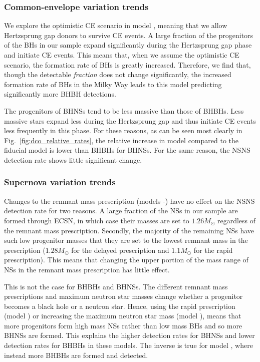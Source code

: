 \subsubsection{Common-envelope variation trends}\label{sec:detection_rate_CE_trends}


We explore the optimistic CE scenario in model \modOpt{}, meaning that we allow Hertzsprung gap donors to survive CE events. A large fraction of the progenitors of the BHs in our sample expand significantly during the Hertzsprung gap phase and initiate CE events. This means that, when we assume the optimistic CE scenario, the formation rate of BHs is greatly increased. Therefore, we find that, though the detectable \textit{fraction} does not change significantly, the increased formation rate of BHs in the Milky Way leads to this model predicting significantly more BHBH detections.

The progenitors of BHNSs tend to be less massive than those of BHBHs. Less massive stars expand less during the Hertzsprung gap and thus initiate CE events less frequently in this phase. For these reasons, as can be seen most clearly in Fig.~\ref{fig:dco_relative_rates}, the relative increase in model \modOpt{} compared to the fiducial model is lower than BHBHs for BHNSs. For the same reason, the NSNS detection rate shows little significant change.

\subsubsection{Supernova variation trends}

Changes to the remnant mass prescription (models \modRapid{}-\modNSHigh{}) have no effect on the NSNS detection rate for two reasons. A large fraction of the NSs in our sample are formed through ECSN, in which case their masses are set to $1.26 \unit{M_\odot}$ regardless of the remnant mass prescription. Secondly, the majority of the remaining NSs have such low progenitor masses that they are set to the lowest remnant mass in the prescription ($1.28 \unit{M_\odot}$ for the delayed prescription and $1.1 \unit{M_\odot}$ for the rapid prescription). This means that changing the upper portion of the mass range of NSs in the remnant mass prescription has little effect.

This is not the case for BHBHs and BHNSs. The different remnant mass prescriptions and maximum neutron star masses change whether a progenitor becomes a black hole or a neutron star. Hence, using the rapid prescription (model \modRapid{}) or increasing the maximum neutron star mass (model \modNSHigh{}), means that more progenitors form high mass NSs rather than low mass BHs and so more BHNSs are formed. This explains the higher detection rates for BHNSs and lower detection rates for BHBHs in these models. The inverse is true for model \modNSLow{}, where instead more BHBHs are formed and detected.

